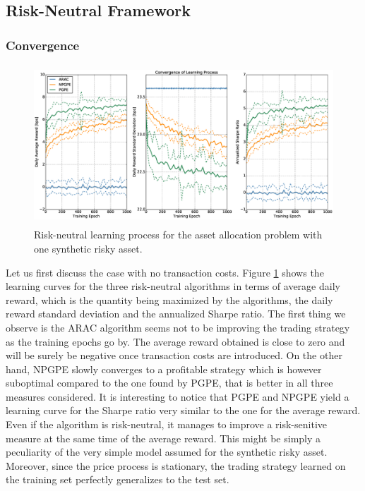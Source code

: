 \subsection{Risk-Neutral Framework}
\subsubsection{Convergence}
\begin{figure}[t!]
	\centering
	\includegraphics[height=6cm,width=1.0\textwidth]{Images/6_0_single_synthetic_neutral_convergence}
	\caption[Risk-neutral learning process for one synthetic risky asset]{Risk-neutral learning process for the asset allocation problem with one synthetic risky asset.}
	\label{fig:single_synthetic_neutral_convergence}
\end{figure}
Let us first discuss the case with no transaction costs. Figure \ref{fig:single_synthetic_neutral_convergence} shows the learning curves for the three risk-neutral algorithms in terms of average daily reward, which is the quantity being maximized by the algorithms, the daily reward standard deviation and the annualized Sharpe ratio. The first thing we observe is the ARAC algorithm seems not to be improving the trading strategy as the training epochs go by. The average reward obtained is close to zero and will be surely be negative once transaction costs are introduced. On the other hand, NPGPE slowly converges to a profitable strategy which is however suboptimal compared to the one found by PGPE, that is better in all three measures considered. It is interesting to notice that PGPE and NPGPE yield a learning curve for the Sharpe ratio very similar to the one for the average reward. Even if the algorithm is risk-neutral, it manages to improve a risk-senitive measure at the same time of the average reward. This might be simply a peculiarity of the very simple model assumed for the synthetic risky asset. Moreover, since the price process is stationary, the trading strategy learned on the training set perfectly generalizes to the test set. 

